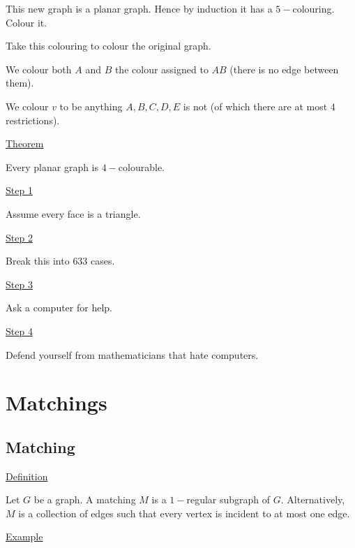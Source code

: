 \documentclass{article}
\begin{document}
\begin{center}
\end{center}

This new graph is a planar graph. Hence by induction it has a $5-$colouring. Colour it. 

Take this colouring to colour the original graph. 

We colour both $A$ and $B$ the colour assigned to $AB$ (there is no edge between them). 

We colour $v$ to be anything $A,B,C,D,E$ is not (of which there are at most $4$ restrictions). 

\underline{Theorem}

Every planar graph is $4-$colourable. 

\underline{Step 1}

Assume every face is a triangle. 

\underline{Step 2}

Break this into $633$ cases. 

\underline{Step 3}

Ask a computer for help.

\underline{Step 4}

Defend yourself from mathematicians that hate computers. 

\section{Matchings}

\subsection{Matching}

\underline{Definition}

Let $G$ be a graph. A matching $M$ is a $1-$regular subgraph of $G$. Alternatively, $M$ is a collection of edges such that every vertex is incident to at most one edge. 

\underline{Example}
\end{document}
